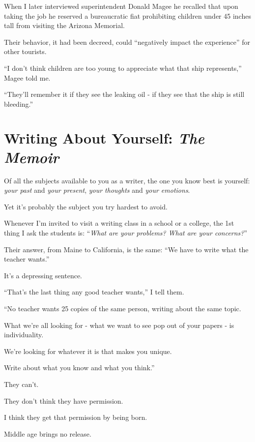 \documentclass{book}
\numberwithin{equation}{section}
\begin{document}
When I later interviewed superintendent Donald Magee he recalled that upon taking the job he reserved a bureaucratic fiat prohibiting children under 45 inches tall from visiting the Arizona Memorial.

Their behavior, it had been decreed, could ``negatively impact the experience'' for other tourists.

%
``I don't think children are too young to appreciate what that ship represents,'' Magee told me.

``They'll remember it if they see the leaking oil - if they see that the ship is still bleeding.''


\chapter{Writing About Yourself: \textit{The Memoir}}

Of all the subjects available to you as a writer, the one you know best is yourself: \textit{your past} and \textit{your present}, \textit{your thoughts} and \textit{your emotions}.

Yet it's probably the subject you try hardest to avoid.

%
Whenever I'm invited to visit a writing class in a school or a college, the 1st thing I ask the students is: ``\textit{What are your problems? What are your concerns?}''

Their answer, from Maine to California, is the same: ``We have to write what the teacher wants.''

It's a depressing sentence.

``That's the last thing any good teacher wants,'' I tell them.

``No teacher wants 25 copies of the same person, writing about the same topic.

What we're all looking for - what we want to see pop out of your papers - is individuality.

We're looking for whatever it is that makes you unique.

Write about what you know and what you think.''

%
They can't.

They don't think they have permission.

I think they get that permission by being born.

Middle age brings no release.
\end{document}
